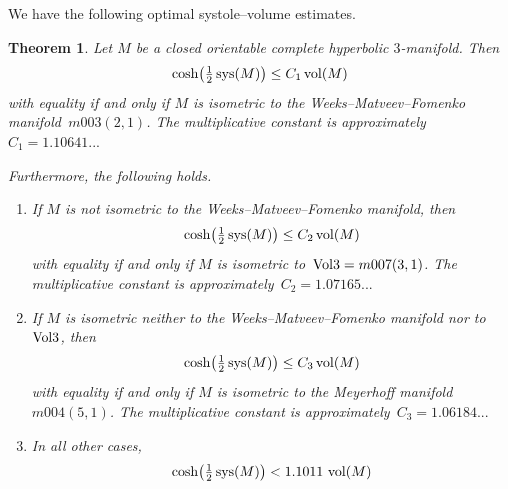 \documentclass[11pt,reqno]{amsart}
\newtheorem{theorem}{Theorem}[section]
\theoremstyle{definition}
\numberwithin{equation}{section}
\DeclareMathOperator{\vol}{{\rm vol}}
\DeclareMathOperator{\sys}{{\rm sys}}
\numberwithin{equation}{section}
\begin{document}
\forgotten


We have the following optimal systole--volume estimates.

\begin{theorem} \label{theo:closed_sys}
Let $M$ be a closed orientable complete hyperbolic $3$-manifold.
Then
\[
\cosh \!\left(\tfrac{1}{2} \sys(M) \right) \leq C_1 \vol(M)
\]
with equality if and only if $M$ is isometric to the Weeks--Matveev--Fomenko manifold~$m003(2,1)$.
The multiplicative constant is approximately~$C_1=1.10641...$

Furthermore, the following holds.
\begin{enumerate}
\item If $M$ is not isometric to the Weeks--Matveev--Fomenko manifold, then 
\[
\cosh \!\left(\tfrac{1}{2} \sys(M) \right) \leq C_2 \vol(M)
\]
with equality if and only if $M$ is isometric to~${\rm Vol}3=m007(3,1)$.
The multiplicative constant is approximately~$C_2=1.07165...$
\item If $M$ is isometric neither to the Weeks--Matveev--Fomenko manifold nor to~${\rm Vol}3$, then 
\[
\cosh \!\left(\tfrac{1}{2} \sys(M) \right) \leq C_3 \vol(M)
\]
with equality if and only if $M$ is isometric to the Meyerhoff manifold~$m004(5,1)$.
The multiplicative constant is approximately~$C_3=1.06184...$
\item In all other cases,
\[
\cosh \!\left(\tfrac{1}{2} \sys(M) \right) < 1.1011 \, \vol(M)
\]
\end{enumerate}
\end{theorem}
\end{document}
